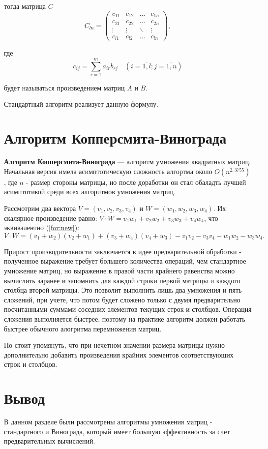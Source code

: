 тогда матрица $C$
\begin{equation}
	C_{ln} = \begin{pmatrix}
		c_{11} & c_{12} & \ldots & c_{1n}\\
		c_{21} & c_{22} & \ldots & c_{2n}\\
		\vdots & \vdots & \ddots & \vdots\\
		c_{l1} & c_{l2} & \ldots & c_{ln}
	\end{pmatrix},
\end{equation}

где
\begin{equation}
	\label{eq:M}
	c_{ij} =
	\sum_{r=1}^{m} a_{ir}b_{rj} \quad (i=\overline{1,l}; j=\overline{1,n})
\end{equation}

будет называться произведением матриц $A$ и $B$.

Стандартный алгоритм реализует данную формулу.


\section{Алгоритм Копперсмита-Винограда}

\textbf{Алгоритм Копперсмита-Винограда} \cite{vinograd-matrix} — алгоритм умножения квадратных матриц. Начальная версия имела асимптотическую сложность алгортма около $O(n^{2,3755})$, где $n$ - размер стороны матрицы, но после доработки он стал обаладть лучшей асимптотикой среди всех алгоритмов умножения матриц.

Рассмотрим два вектора $V = (v_1, v_2, v_3, v_4)$ и $W = (w_1, w_2, w_3, w_4)$.
Их скалярное произведение равно: $V \cdot W = v_1w_1 + v_2w_2 + v_3w_3 + v_4w_4$, что эквивалентно (\ref{for:new}):
\begin{equation}
	\label{for:new}
	V \cdot W = (v_1 + w_2)(v_2 + w_1) + (v_3 + w_4)(v_4 + w_3) - v_1v_2 - v_3v_4 - w_1w_2 - w_3w_4.
\end{equation}

Прирост производительности заключается в идее предварительной обработки - полученное выражение требует большего количества операций, чем стандартное умножение матриц, но выражение в правой части крайнего равенства можно вычислить заранее и запомнить для каждой строки первой матрицы и каждого столбца второй матрицы. 
Это позволит выполнить лишь два умножения и пять сложений, при учете, что потом будет сложено только с двумя предварительно посчитанными суммами соседних элементов текущих строк и столбцов. Операция сложения выполняется быстрее, поэтому на практике алгоритм должен работать быстрее обычного алогритма перемножения матриц.

Но стоит упомянуть, что при нечетном значении размера матрицы нужно дополнительно добавить произведения крайних элементов соответствующих строк и столбцов.


\section*{Вывод}

В данном разделе были рассмотрены алгоритмы умножения матриц - стандартного и Винограда, который имеет большую эффективность за счет предварительных вычислений.



